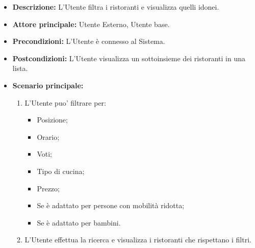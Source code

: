 \label{usecase:Filtro ristoranti}
    \begin{itemize}
    \item \textbf{Descrizione:} L'Utente filtra i ristoranti e visualizza quelli idonei.

    \item \textbf{Attore principale:} Utente Esterno, Utente base.

    \item \textbf{Precondizioni:} L'Utente è connesso al Sistema.

    \item \textbf{Postcondizioni:} L'Utente visualizza un sottoinsieme dei ristoranti in una lista.

    \item \textbf{Scenario principale:}
    \begin{enumerate}
        \item L'Utente puo' filtrare per:
        \begin{itemize}
            \item Posizione;
            \item Orario;
            \item Voti;
            \item Tipo di cucina;
            \item Prezzo;
            \item Se è adattato per persone con mobilità ridotta;
            \item Se è adattato per bambini.
        \end{itemize}
        \item L'Utente effettua la ricerca e visualizza i ristoranti che rispettano i filtri.
    \end{enumerate}
\end{itemize}